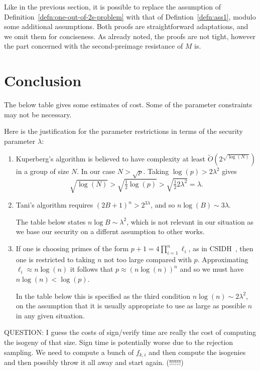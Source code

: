 \documentclass{llncs}
\begin{document}
Like in the previous section, it is possible to replace the assumption of Definition~\ref{defn:one-out-of-2s-problem} with that of Defintion~\ref{defn:ass1}, modulo some additional assumptions.
Both proofs are straightforward adaptations, and we omit them for conciseness.
As already noted, the proofs are not tight, however the part concerned with the second-preimage resistance of $M$ is.


\section{Conclusion}


The below table gives some estimates of cost.
Some of the parameter constraints may not be necessary.


Here is the justification for the parameter restrictions in terms of the security parameter $\lambda$:
\begin{enumerate}
\item Kuperberg's algorithm is believed to have complexity at least $\tilde{O}( 2^{\sqrt{\log(N)}} )$ in a group of size $N$. In our case $N > \sqrt{p}$. Taking $\log(p) > 2 \lambda^2$ gives 
\[
   \sqrt{ \log(N)} > \sqrt{ \tfrac{1}{2} \log(p) } > \sqrt{ \tfrac{1}{2} 2 \lambda^2 } = \lambda.
\]
\item Tani's algorithm requires $(2B+1)^n > 2^{3 \lambda}$, and so $n \log(B) \sim 3 \lambda$.

The table below states  $n\log B\sim \lambda^2$, which is not relevant in our situation as we base our security on a differnt assumption to other works.


\item If one is choosing primes of the form $p+1 = 4\prod_{i=1}^n\ell_i$, as in CSIDH~\cite{CLMPR18}, then one is restricted to taking $n$ not too large compared with $p$.
Approximating $\ell_i \approx n \log(n)$ it follows that $p \approx (n \log(n))^n$ and so we must have $n \log(n) < \log(p)$.

In the table below this is specified as the third condition $n \log(n) \sim 2 \lambda^2$, on the assumption that it is usually appropriate to use as large as possible $n$ in any given situation.
\end{enumerate}


QUESTION: I guess the costs of sign/verify time are really the cost of computing the isogeny of that size. Sign time is potentially worse due to the rejection sampling. We need to compute a bunch of $f_{k,i}$ and then compute the isogenies and then possibly throw it all away and start again. (!!!!!!)
\end{document}
